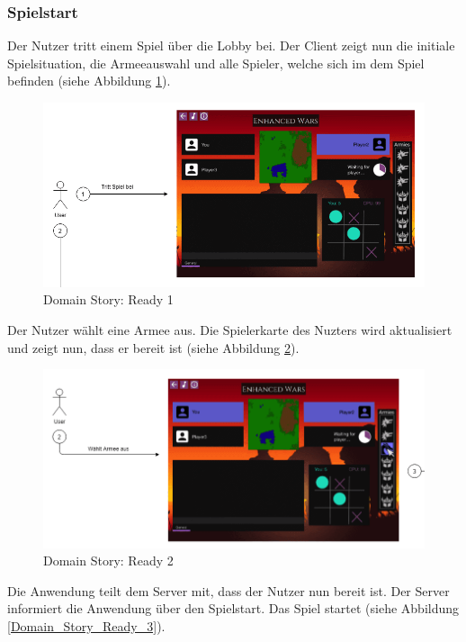 \documentclass[12pt, titlepage]{scrartcl}
\begin{document}
		    \subsubsection{Spielstart}
		    	Der Nutzer tritt einem Spiel \"uber die Lobby bei. Der Client zeigt nun die initiale Spielsituation, die Armeeauswahl und alle Spieler, welche sich im dem Spiel befinden (siehe Abbildung \ref{Domain_Story_Ready_1}).
			    \begin{figure}[H] 
			    	\centering
			    	\includegraphics[width=\textwidth]{images/domain_stories/readyStory1.png}
			    	\caption{Domain Story: Ready 1}
			    	\label{Domain_Story_Ready_1}
			    \end{figure}
			Der Nutzer w\"ahlt eine Armee aus. Die Spielerkarte des Nuzters wird aktualisiert und zeigt nun, dass er bereit ist (siehe Abbildung \ref{Domain_Story_Ready_2}).
			    \begin{figure}[H] 
			    	\centering
			    	\includegraphics[width=\textwidth]{images/domain_stories/readyStory2.png}
			    	\caption{Domain Story: Ready 2}
			    	\label{Domain_Story_Ready_2}
			    \end{figure}
			Die Anwendung teilt dem Server mit, dass der Nutzer nun bereit ist. Der Server informiert die Anwendung \"uber den Spielstart. Das Spiel startet (siehe Abbildung \ref{Domain_Story_Ready_3}).
\end{document}

